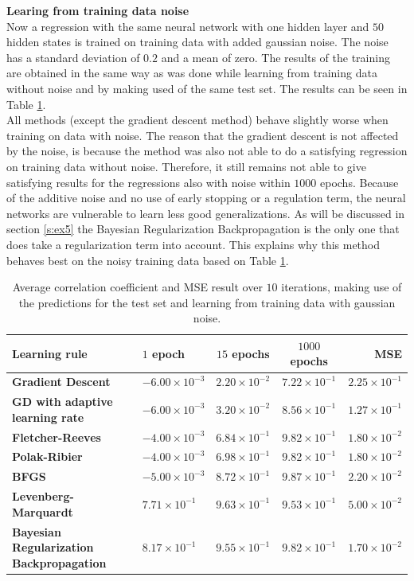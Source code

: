 \documentclass[a4paper,10pt]{article}
\begin{document}
\textbf{Learing from training data noise}\\
Now a regression with the same neural network with one hidden layer and $ 50 $ hidden states is trained on training data with added gaussian noise. The noise has a standard deviation of $ 0.2 $ and a mean of zero. The results of the training are obtained in the same way as was done while learning from training data without noise and by making used of the same test set. The results can be seen in Table \ref{tab:corr_with_noise}.\\

All methods (except the gradient descent method) behave slightly worse when training on data with noise. The reason that the gradient descent is not affected by the noise, is because the method was also not able to do a satisfying regression on training data without noise. Therefore, it still remains not able to give satisfying results for the regressions also with noise within $ 1000 $ epochs. Because of the additive noise and no use of early stopping or a regulation term, the neural networks are vulnerable to learn less good generalizations. As will be discussed in section \ref{s:ex5} the Bayesian Regularization Backpropagation is the only one that does take a regularization term into account. This explains why this method behaves best on the noisy training data based on Table \ref{tab:corr_with_noise}.

\begin{table}
	\centering
	\begin{tabular}{@{}l|lccr@{}} \toprule
		\textbf{Learning rule}    & $ 1 $ epoch & $ 15 $ epochs & $ 1000 $ epochs & MSE \\\midrule
		\textbf{Gradient Descent}    & $ -6.00\times10^{-3} $  & $ 2.20\times10^{-2} $  & $ 7.22\times10^{-1} $ & $ 2.25\times10^{-1} $ \\
		\textbf{GD with adaptive learning rate} & $ -6.00\times10^{-3} $  & $ 3.20\times10^{-2} $  & $ 8.56\times10^{-1} $ & $ 1.27\times10^{-1} $  \\
		\textbf{Fletcher-Reeves} & $ -4.00\times10^{-3} $  & $6.84\times10^{-1} $  & $ 9.82\times10^{-1} $ & $ 1.80\times10^{-2} $ \\
		\textbf{Polak-Ribier} & $ -4.00\times10^{-3} $  & $ 6.98\times10^{-1} $  & $ 9.82\times10^{-1} $ & $ 1.80\times10^{-2} $  \\
		\textbf{BFGS} & $ -5.00\times10^{-3} $  & $ 8.72\times10^{-1} $  & $ 9.87\times10^{-1} $ & $ 2.20\times10^{-2} $ \\
		\textbf{Levenberg-Marquardt} & $ 7.71\times10^{-1} $  & $ 9.63\times10^{-1} $  & $9.53\times10^{-1} $ & $ 5.00\times10^{-2} $ \\
		\textbf{Bayesian Regularization Backpropagation} & $ 8.17\times10^{-1} $  & $ 9.55\times10^{-1}$  & $ 9.82\times10^{-1} $ & $ 1.70\times10^{-2} $ \\ \bottomrule
	\end{tabular}
	\caption{Average correlation coefficient and MSE result over $ 10 $ iterations, making use of the predictions for the test set and learning from training data with gaussian noise.}
	\label{tab:corr_with_noise}
\end{table}
\end{document}
